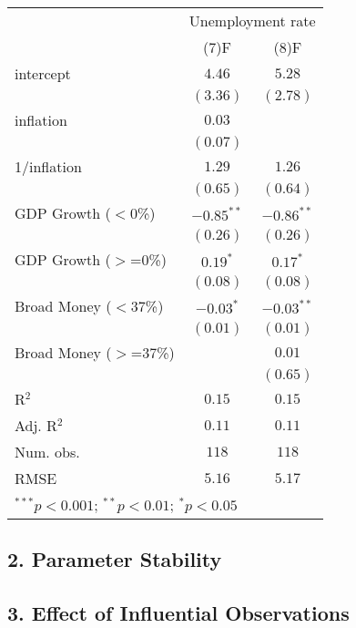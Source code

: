 \documentclass[
]{article}
\begin{document}
\begin{tabular}{l c c}
\hline
 & \multicolumn{2}{c}{Unemployment rate} \\
\cline{2-3}
 & (7)F & (8)F \\
\hline
intercept              & $4.46$       & $5.28$       \\
                       & $(3.36)$     & $(2.78)$     \\
inflation              & $0.03$       &              \\
                       & $(0.07)$     &              \\
1/inflation            & $1.29$       & $1.26$       \\
                       & $(0.65)$     & $(0.64)$     \\
GDP Growth ($<$0\%)    & $-0.85^{**}$ & $-0.86^{**}$ \\
                       & $(0.26)$     & $(0.26)$     \\
GDP Growth ($>$=0\%)   & $0.19^{*}$   & $0.17^{*}$   \\
                       & $(0.08)$     & $(0.08)$     \\
Broad Money ($<$37\%)  & $-0.03^{*}$  & $-0.03^{**}$ \\
                       & $(0.01)$     & $(0.01)$     \\
Broad Money ($>$=37\%) &              & $0.01$       \\
                       &              & $(0.65)$     \\
\hline
R$^2$                  & $0.15$       & $0.15$       \\
Adj. R$^2$             & $0.11$       & $0.11$       \\
Num. obs.              & $118$        & $118$        \\
RMSE                   & $5.16$       & $5.17$       \\
\hline
\multicolumn{3}{l}{\scriptsize{$^{***}p<0.001$; $^{**}p<0.01$; $^{*}p<0.05$}}
\end{tabular}

\hypertarget{parameter-stability}{%
\subsection{2. Parameter Stability}\label{parameter-stability}}

\hypertarget{effect-of-influential-observations}{%
\subsection{3. Effect of Influential
Observations}\label{effect-of-influential-observations}}
\end{document}
